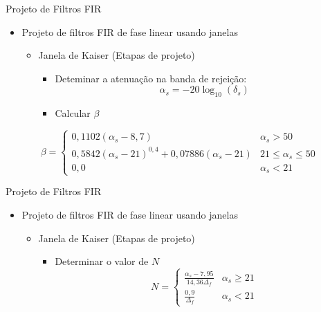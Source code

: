\begin{slide}{Projeto de Filtros FIR}
\begin{itemize}
   \item  Projeto de filtros FIR de fase linear usando janelas 
   \begin{itemize}
      \item Janela de Kaiser (Etapas de projeto)
      \begin{itemize}
         \item Deteminar a atenua\c c\~ao na banda de rejei\c c\~ao:
         \begin{equation*}
            \alpha_s = -20\log_{10}(\delta_s)
         \end{equation*}
         \item Calcular $\beta$
      \end{itemize}    
   \end{itemize}
\end{itemize}
\begin{equation*}
            \beta =\begin{cases}
                       0,1102(\alpha_s-8,7) & \alpha_s>50\\
                       0,5842(\alpha_s-21)^{0,4}+0,07886(\alpha_s-21) & 21\leq \alpha_s\leq 50\\
                       0,0 & \alpha_s<21
                   \end{cases}
         \end{equation*}
\end{slide}

\begin{slide}{Projeto de Filtros FIR}
\begin{itemize}
   \item  Projeto de filtros FIR de fase linear usando janelas 
   \begin{itemize}
      \item Janela de Kaiser (Etapas de projeto)
      \begin{itemize}
         \item Determinar o valor de $N$
         \begin{equation*}
            N = \begin{cases}
                 \frac{\alpha_s-7,95}{14,36\Delta_f} & \alpha_s\geq 21\\
                 \frac{0,9}{\Delta_f} & \alpha_s<21
                \end{cases}
         \end{equation*}
      \end{itemize}    
   \end{itemize}
\end{itemize}
\end{slide}



